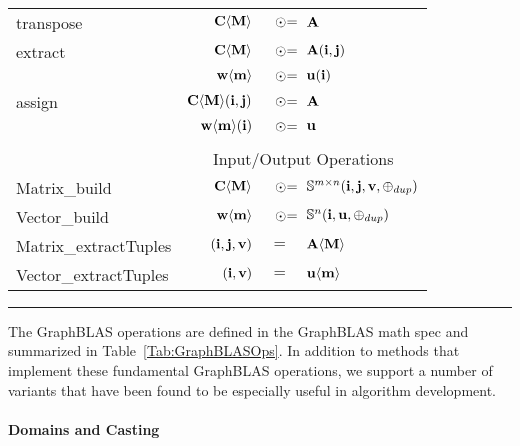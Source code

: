 \begin{table*}[h]
\begin{center}
\begin{tabular}{l|rrl}
{\sf transpose}    & ${\bf C}\langle{\bf M}\rangle$ & $\odotequals$ & ${\bf A}$ \\
{\sf extract}      & ${\bf C}\langle{\bf M}\rangle$ & $\odotequals$ & ${\bf A}({\bf i},{\bf j})$ \\
                   & ${\bf w}\langle{\bf m}\rangle$ & $\odotequals$ & ${\bf u}({\bf i})$ \\
{\sf assign}       & ${\bf C}\langle{\bf M}\rangle({\bf i},{\bf j})$ & $\odotequals$ & ${\bf A}$ \\
                   & ${\bf w}\langle{\bf m}\rangle({\bf i})$ & $\odotequals$ & ${\bf u}$ \\
& & & \\
& \multicolumn{3}{c}{Input/Output Operations} \\
{\sf Matrix\_build}  & ${\bf C}\langle{\bf M}\rangle$ & $\odotequals$ & $\mathbb{S}^{m\times n}({\bf i},{\bf j},{\bf v},\oplus_{dup})$ \\
{\sf Vector\_build}  & ${\bf w}\langle{\bf m}\rangle$ & $\odotequals$ & $\mathbb{S}^{n}({\bf i},{\bf u},\oplus_{dup})$ \\
{\sf Matrix\_extractTuples} & $({\bf i},{\bf j},{\bf v})$ & $=$ & ${\bf A}\langle{\bf M}\rangle$ \\
{\sf Vector\_extractTuples} & $({\bf i},{\bf v})$ & $=$ & ${\bf u}\langle{\bf m}\rangle$ \\
\end{tabular}
\end{center}
\hrule
\end{table*}

The GraphBLAS operations are defined in the GraphBLAS math spec and summarized in 
Table~\ref{Tab:GraphBLASOps}.   In addition to methods that implement these
fundamental GraphBLAS operations, we support a number of variants that have been 
found to be especially useful in algorithm development.


%


\paragraph{Domains and Casting}

